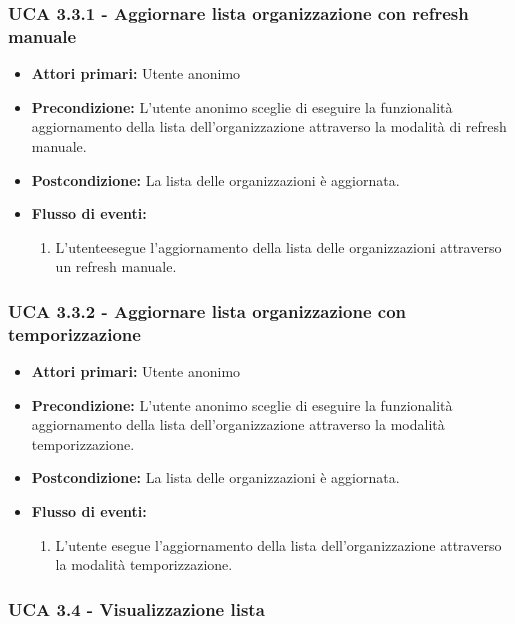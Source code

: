 \subsubsection{UCA 3.3.1 - Aggiornare lista organizzazione con refresh manuale}%
\begin{itemize}
	\item \textbf{Attori primari:} Utente anonimo
	\item \textbf{Precondizione:} L'utente anonimo sceglie di eseguire la funzionalità aggiornamento della lista dell'organizzazione attraverso la modalità di refresh manuale.
	\item \textbf{Postcondizione:} La lista delle organizzazioni è aggiornata.
	\item \textbf{Flusso di eventi:}
	\begin{enumerate}
		\item L'utenteesegue l'aggiornamento della lista delle organizzazioni attraverso un refresh manuale.
	\end{enumerate}
	
\end{itemize}

\subsubsection{UCA 3.3.2 - Aggiornare lista organizzazione con temporizzazione}%
\begin{itemize} 
	\item \textbf{Attori primari:} Utente anonimo
	\item \textbf{Precondizione:} L'utente anonimo sceglie di eseguire la funzionalità aggiornamento della lista dell'organizzazione attraverso la modalità temporizzazione.
	\item \textbf{Postcondizione:} La lista delle organizzazioni è aggiornata.
	\item \textbf{Flusso di eventi:}
	\begin{enumerate}
		\item L'utente esegue l'aggiornamento della lista dell'organizzazione attraverso la modalità temporizzazione.
	\end{enumerate}
\end{itemize}

\newpage


\subsubsection{UCA 3.4 - Visualizzazione lista}%

